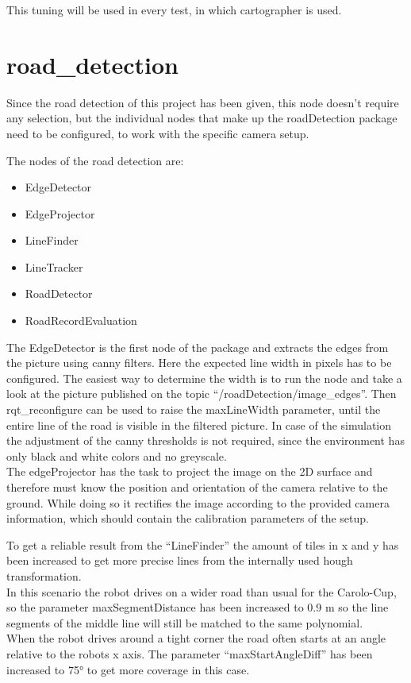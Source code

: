 This tuning will be used in every test, in which cartographer is used.

\section{road\_detection}

Since the road detection of this project has been given, this node doesn't require any selection, but the individual nodes that make up the roadDetection package need to be configured, to work with the specific camera setup.

The nodes of the road detection are:
\begin{itemize}
	\item EdgeDetector
	\item EdgeProjector
	\item LineFinder
	\item LineTracker
	\item RoadDetector
	\item RoadRecordEvaluation
\end{itemize}

The EdgeDetector is the first node of the package and extracts the edges from the picture using canny filters. Here the expected line width in pixels has to be configured. The easiest way to determine the width is to run the node and take a look at the picture published on the topic ``/roadDetection/image\_edges''. Then rqt\_reconfigure can be used to raise the maxLineWidth parameter, until the entire line of the road is visible in the filtered picture. In case of the simulation the adjustment of the canny thresholds is not required, since the environment has only black and white colors and no greyscale.\\

The edgeProjector has the task to project the image on the 2D surface and therefore must know the position and orientation of the camera relative to the ground. While doing so it rectifies the image according to the provided camera information, which should contain the calibration parameters of the setup.

To get a reliable result from the ``LineFinder'' the amount of tiles in x and y has been increased to get more precise lines from the internally used hough transformation.\\
In this scenario the robot drives on a wider road than usual for the Carolo-Cup, so the parameter maxSegmentDistance has been increased to 0.9 m so the line segments of the middle line will still be matched to the same polynomial.\\
When the robot drives around a tight corner the road often starts at an angle relative to the robots x axis. The parameter ``maxStartAngleDiff'' has been increased to 75° to get more coverage in this case.\\

